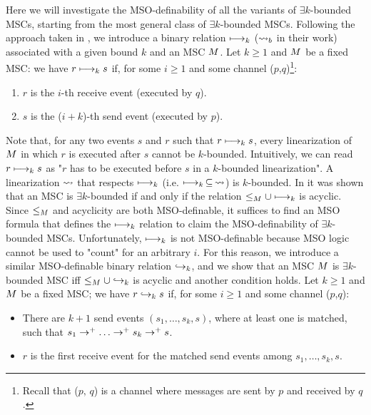 Here we will investigate the MSO-definability of all the variants of $\exists k$-bounded MSCs, starting from the most general class of $\exists k$-bounded MSCs.
Following the approach taken in \cite{DBLP:conf/fossacs/LohreyM02}, we introduce a binary relation $\longmapsto_k$ ($\rightsquigarrow_b$ in their work) associated with a given bound $k$ and an MSC $M$. Let $k \ge 1$ and $M$ be a fixed MSC: we have $r \longmapsto_k s$ if, for some $i \ge 1$ and some channel ($p$,$q$)\footnote{Recall that ($p,\,q$) is a channel where messages are sent by $p$ and received by $q$.}:
\begin{enumerate}\itemsep=0.5ex
	\item $r$ is the $i$-th receive event (executed by $q$).
	\item $s$ is the ($i+k$)-th send event (executed by $p$).
\end{enumerate}
Note that, for any two events $s$ and $r$ such that $r \longmapsto_k s$, every linearization of $M$ in which $r$ is executed after $s$ cannot be $k$-bounded. Intuitively, we can read $r \longmapsto_k s$ as "$r$ has to be executed before $s$ in a $k$-bounded linearization". A linearization $\rightsquigarrow$ that respects $\longmapsto_k$ (i.e. $\longmapsto_k \,\subseteq\, \rightsquigarrow$) is $k$-bounded. In \cite{DBLP:conf/fossacs/LohreyM02} it was shown that an MSC is $\exists k$-bounded if and only if the relation $\le_M \cup \longmapsto_k$ is acyclic. Since $\le_M$ and acyclicity are both MSO-definable, it suffices to find an MSO formula that defines the $\longmapsto_k$ relation to claim the MSO-definability of $\exists k$-bounded MSCs. Unfortunately, $\longmapsto_k$ is not MSO-definable because MSO logic cannot be used to "count" for an arbitrary $i$. For this reason, we introduce a similar MSO-definable binary relation $\hookrightarrow_{k}$, and we show that an MSC $M$ is $\exists k$-bounded MSC iff $\le_M \cup \hookrightarrow_{k}$ is acyclic and another condition holds. Let $k \ge 1$ and $M$ be a fixed MSC; we have $r \hookrightarrow_{k} s$ if, for some $i \ge 1$ and some channel ($p$,$q$):
\begin{itemize}\itemsep=0.5ex
	\item There are $k+1$ send events $(s_1, \dots, s_k, s)$, where at least one is matched, such that $s_1 \procrel^+ \dots \procrel^+ s_k \procrel^+ s$.
 	\item $r$ is the first receive event for the matched send events among $s_1, \dots, s_k, s$.
\end{itemize}

